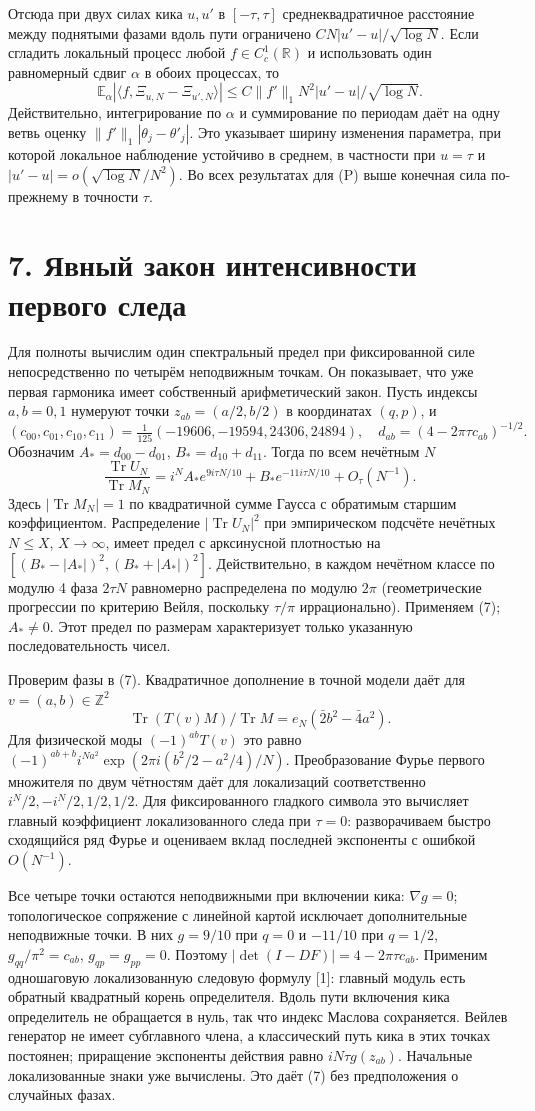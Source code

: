 \documentclass[11pt,a4paper]{article}
\newcommand{\Tr}{\operatorname{Tr}}
\newcommand{\EE}{\mathbb E}
\newcommand{\R}{\mathbb R}
\newcommand{\Z}{\mathbb Z}
\newcommand{\sect}[1]{\section*{\sffamily\color{ink}#1}}
\begin{document}
Отсюда при двух силах кика $u,u'$ в $[-\tau,\tau]$ среднеквадратичное расстояние между поднятыми фазами вдоль пути ограничено $C N|u'-u|/\sqrt{\log N}$. Если сгладить локальный процесс любой $f\in C_c^1(\R)$ и использовать один равномерный сдвиг $\alpha$ в обоих процессах, то
\[
 \EE_\alpha|\langle f,\Xi_{u,N}-\Xi_{u',N}\rangle|
 \le C\|f'\|_1 N^2|u'-u|/\sqrt{\log N}.
\]
Действительно, интегрирование по $\alpha$ и суммирование по периодам даёт на одну ветвь оценку $\|f'\|_1|\theta_j-\theta'_j|$. Это указывает ширину изменения параметра, при которой локальное наблюдение устойчиво в среднем, в частности при $u=\tau$ и $|u'-u|=o(\sqrt{\log N}/N^2)$. Во всех результатах для (P) выше конечная сила по-прежнему в точности $\tau$.
\newpage
\sect{7. Явный закон интенсивности первого следа}
Для полноты вычислим один спектральный предел при фиксированной силе непосредственно по четырём неподвижным точкам. Он показывает, что уже первая гармоника имеет собственный арифметический закон. Пусть индексы $a,b=0,1$ нумеруют точки $z_{ab}=(a/2,b/2)$ в координатах $(q,p)$, и
\[
 (c_{00},c_{01},c_{10},c_{11})=\tfrac1{125}(-19606,-19594,24306,24894),
 \quad d_{ab}=(4-2\pi\tau c_{ab})^{-1/2}.
\]
Обозначим $A_*=d_{00}-d_{01}$, $B_*=d_{10}+d_{11}$. Тогда по всем нечётным $N$
\[
 \frac{\Tr U_N}{\Tr M_N}
 =i^N A_*e^{9i\tau N/10}+B_* e^{-11i\tau N/10}+O_\tau(N^{-1}).           \tag{7}
\]
Здесь $|\Tr M_N|=1$ по квадратичной сумме Гаусса с обратимым старшим коэффициентом. Распределение $|\Tr U_N|^2$ при эмпирическом подсчёте нечётных $N\le X$, $X\to\infty$, имеет предел с арксинусной плотностью на $[(B_*-|A_*|)^2,(B_*+|A_*|)^2]$. Действительно, в каждом нечётном классе по модулю 4 фаза $2\tau N$ равномерно распределена по модулю $2\pi$ (геометрические прогрессии по критерию Вейля, поскольку $\tau/\pi$ иррационально). Применяем (7); $A_*\ne0$. Этот предел по размерам характеризует только указанную последовательность чисел.

Проверим фазы в (7). Квадратичное дополнение в точной модели даёт для $v=(a,b)\in\Z^2$
\[
 \Tr(T(v)M)/\Tr M=e_N(\bar2 b^2-\bar4 a^2).
\]
Для физической моды $(-1)^{ab}T(v)$ это равно
$(-1)^{ab+b} i^{Na^2}\exp(2\pi i(b^2/2-a^2/4)/N)$.
Преобразование Фурье первого множителя по двум чётностям даёт для локализаций соответственно $i^N/2,-i^N/2,1/2,1/2$. Для фиксированного гладкого символа это вычисляет главный коэффициент локализованного следа при $\tau=0$: разворачиваем быстро сходящийся ряд Фурье и оцениваем вклад последней экспоненты с ошибкой $O(N^{-1})$.

Все четыре точки остаются неподвижными при включении кика: $\nabla g=0$; топологическое сопряжение с линейной картой исключает дополнительные неподвижные точки. В них $g=9/10$ при $q=0$ и $-11/10$ при $q=1/2$, $g_{qq}/\pi^2=c_{ab}$, $g_{qp}=g_{pp}=0$. Поэтому $|\det(I-DF)|=4-2\pi\tau c_{ab}$. Применим одношаговую локализованную следовую формулу [1]: главный модуль есть обратный квадратный корень определителя. Вдоль пути включения кика определитель не обращается в нуль, так что индекс Маслова сохраняется. Вейлев генератор не имеет субглавного члена, а классический путь кика в этих точках постоянен; приращение экспоненты действия равно $iN\tau g(z_{ab})$. Начальные локализованные знаки уже вычислены. Это даёт (7) без предположения о случайных фазах.
\end{document}
